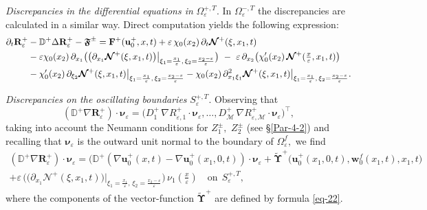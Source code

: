 \documentclass[reqno]{amsart}            %
\numberwithin{equation}{section}
\begin{document}
	
	\textit{Discrepancies in the differential equations in} $\Omega^{+, T}_\varepsilon.$ In $\Omega^{-, T}_\varepsilon$ the discrepancies are calculated in a similar way.  Direct computation yields the following expression:
	\begin{align}\label{res-1}
		\partial_t\mathbf{R}_\varepsilon^+ & - \mathbb{D}^+ \Delta \mathbf{R}_\varepsilon^+   - \boldsymbol{\mathfrak{F}}^\pm  =  \mathbf{F}^+(\mathbf{u}_0^+, x, t)  + \varepsilon\, \chi_0(x_2) \, \partial_t\boldsymbol{\mathcal{N}}^+(\xi,x_1,t) \notag
		\\
		&  -   \varepsilon \chi_0(x_2) \,  \partial_{x_1} \big(\big(\partial_{x_1}\boldsymbol{\mathcal{N}}^+(\xi,x_1,t)\bigr)\big|_{\xi_1=\frac{x_1}{\varepsilon}, \, \xi_2=\frac{x_2 - \varepsilon}{\varepsilon}}\big) 
		\ - \ \varepsilon \,\partial_{x_2}\bigl( \chi^\prime_0(x_2)\, \boldsymbol{\mathcal{N}}^+(\tfrac{x}{\varepsilon}, x_1, t) \bigr) \notag
		\\
		&
		- \chi^\prime_0(x_2)\, \partial_{\xi_2}\boldsymbol{\mathcal{N}}^+(\xi,x_1,t)\big|_{\xi_1=\frac{x_1}{\varepsilon}, \, \xi_2=\frac{x_2 - \varepsilon}{\varepsilon}}
		-   \chi_0(x_2) \, \partial^2_{x_1\xi_1}\boldsymbol{\mathcal{N}}^+(\xi,x_1,t)\big|_{\xi_1=\frac{x_1}{\varepsilon}, \, \xi_2=\frac{x_2 - \varepsilon}{\varepsilon}}.
	\end{align}
	
	\textit{Discrepancies on the oscillating boundaries} $S^{+, T}_\varepsilon.$ Observing that
	$$
	(\mathbb{D}^+\nabla\mathbf{R}_\varepsilon^+)\cdot\boldsymbol{\nu}_\varepsilon = 
	\big(D_1^+\,\nabla R^+_{\varepsilon, 1}\cdot\boldsymbol{\nu}_\varepsilon,\dots,D_{\mathcal{M}}^+\,\nabla R^+_{\varepsilon,\mathcal{M}}\cdot\boldsymbol{\nu}_\varepsilon\big)^\top,
	$$
	taking into account the Neumann conditions for $Z^\pm_1,$ $Z^\pm_2$ (see \S \ref{Par-4-2}) and recalling that $\boldsymbol{\nu}_\varepsilon$ is the outward unit normal to the boundary of $\Omega^f_\varepsilon,$ we find 
	\begin{multline}\label{res-2}
		(\mathbb{D}^+\nabla\mathbf{R}_\varepsilon^+)\cdot\boldsymbol{\nu}_\varepsilon  = (\mathbb{D}^+(\nabla\mathbf{u}_0^+(x,t) -\nabla\mathbf{u}_0^+(x_1,0,t))\cdot\boldsymbol{\nu}_\varepsilon 
		+  \widetilde{\boldsymbol{\Upsilon}}^+\big(\mathbf{u}^+_0(x_1,0,t), \mathbf{w}^f_0(x_1,t), x_1, t \big)
		\\ +
		\varepsilon\, \big(\big(\partial_{x_1}\boldsymbol{\mathcal{N}}^+(\xi,x_1,t)\bigr)\big|_{\xi_1=\frac{x_1}{\varepsilon}, \, \xi_2=\frac{x_2 - \varepsilon}{\varepsilon}}\big) \, \nu_1(\tfrac{x}{\varepsilon})
		\quad \text{on} \ \
		S^{+, T}_\varepsilon, 
	\end{multline}
	where the components of the vector-function $\widetilde{\boldsymbol{\Upsilon}}^+$ are defined by formula \eqref{eq-22}. 
	
\end{document}
